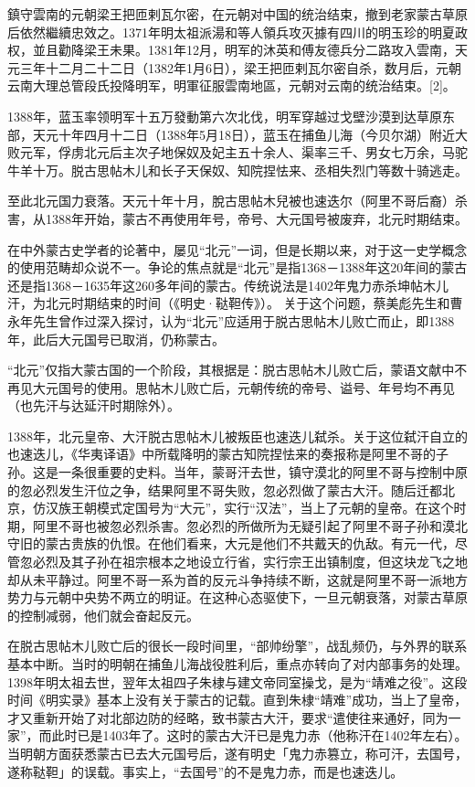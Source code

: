 鎮守雲南的元朝梁王把匝剌瓦尔密，在元朝对中国的统治结束，撤到老家蒙古草原后依然繼續忠效之。1371年明太祖派湯和等人領兵攻灭據有四川的明玉珍的明夏政权，並且勸降梁王未果。1381年12月，明军的沐英和傅友德兵分二路攻入雲南，天元三年十二月二十二日（1382年1月6日），梁王把匝剌瓦尔密自杀，数月后，元朝云南大理总管段氏投降明军，明軍征服雲南地區，元朝对云南的统治结束。[2]。

1388年，蓝玉率领明军十五万發動第六次北伐，明军穿越过戈壁沙漠到达草原东部，天元十年四月十二日（1388年5月18日），蓝玉在捕鱼儿海（今贝尔湖）附近大败元军，俘虏北元后主次子地保奴及妃主五十余人、渠率三千、男女七万余，马驼牛羊十万。脱古思帖木儿和长子天保奴、知院捏怯来、丞相失烈门等数十骑逃走。

至此北元国力衰落。天元十年十月，脫古思帖木兒被也速迭尔（阿里不哥后裔）杀害，从1388年开始，蒙古不再使用年号，帝号、大元国号被废弃，北元时期结束。

在中外蒙古史学者的论著中，屡见“北元”一词，但是长期以来，对于这一史学概念的使用范畴却众说不一。争论的焦点就是“北元”是指1368－1388年这20年间的蒙古还是指1368－1635年这260多年间的蒙古。传统说法是1402年鬼力赤杀坤帖木儿汗，为北元时期结束的时间（《明史·鞑靼传》）。 关于这个问题，蔡美彪先生和曹永年先生曾作过深入探讨，认为“北元”应适用于脱古思帖木儿败亡而止，即1388年，此后大元国号已取消，仍称蒙古。

“北元”仅指大蒙古国的一个阶段，其根据是：脱古思帖木儿败亡后，蒙语文献中不再见大元国号的使用。思帖木儿败亡后，元朝传统的帝号、谥号、年号均不再见（也先汗与达延汗时期除外）。

1388年，北元皇帝、大汗脱古思帖木儿被叛臣也速迭儿弑杀。关于这位弑汗自立的也速迭儿，《华夷译语》中所载降明的蒙古知院捏怯来的奏报称是阿里不哥的子孙。这是一条很重要的史料。当年，蒙哥汗去世，镇守漠北的阿里不哥与控制中原的忽必烈发生汗位之争，结果阿里不哥失败，忽必烈做了蒙古大汗。随后迁都北京，仿汉族王朝模式定国号为“大元”，实行“汉法”，当上了元朝的皇帝。在这个时期，阿里不哥也被忽必烈杀害。忽必烈的所做所为无疑引起了阿里不哥子孙和漠北守旧的蒙古贵族的仇恨。在他们看来，大元是他们不共戴天的仇敌。有元一代，尽管忽必烈及其子孙在祖宗根本之地设立行省，实行宗王出镇制度，但这块龙飞之地却从未平静过。阿里不哥一系为首的反元斗争持续不断，这就是阿里不哥一派地方势力与元朝中央势不两立的明证。在这种心态驱使下，一旦元朝衰落，对蒙古草原的控制减弱，他们就会奋起反元。

在脱古思帖木儿败亡后的很长一段时间里，“部帅纷擎”，战乱频仍，与外界的联系基本中断。当时的明朝在捕鱼儿海战役胜利后，重点亦转向了对内部事务的处理。1398年明太祖去世，翌年太祖四子朱棣与建文帝同室操戈，是为“靖难之役”。这段时间《明实录》基本上没有关于蒙古的记载。直到朱棣“靖难”成功，当上了皇帝，才又重新开始了对北部边防的经略，致书蒙古大汗，要求“遣使往来通好，同为一家”，而此时已是1403年了。这时的蒙古大汗已是鬼力赤（他称汗在1402年左右）。当明朝方面获悉蒙古已去大元国号后，遂有明史「鬼力赤篡立，称可汗，去国号，遂称鞑靼」的误载。事实上，“去国号”的不是鬼力赤，而是也速迭儿。

